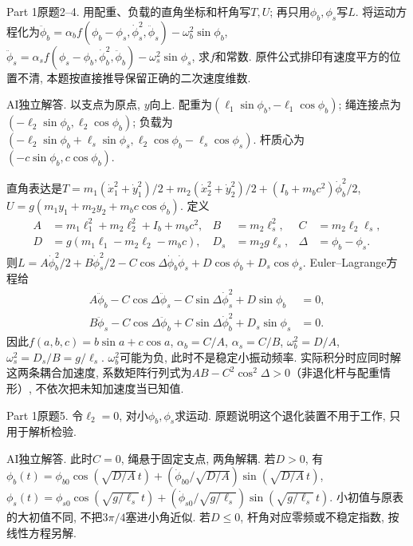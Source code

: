 \begin{exercise}
Part 1原题2--4. 用配重、负载的直角坐标和杆角写$T,U$; 再只用$\phi_b,\phi_s$写$L$. 将运动方程化为$\ddot\phi_b=\alpha_b f(\phi_b-\phi_s,\dot\phi_s^2,\ddot\phi_s)-\omega_b^2\sin\phi_b$, $\ddot\phi_s=\alpha_s f(\phi_s-\phi_b,\dot\phi_b^2,\ddot\phi_b)-\omega_s^2\sin\phi_s$, 求$f$和常数. 原件公式排印有速度平方的位置不清, 本题按直接推导保留正确的二次速度维数.
\end{exercise}
\begin{solution}
AI独立解答. 以支点为原点, $y$向上. 配重为$(\ell_1\sin\phi_b,-\ell_1\cos\phi_b)$; 绳连接点为$(-\ell_2\sin\phi_b,\ell_2\cos\phi_b)$; 负载为$(-\ell_2\sin\phi_b+\ell_s\sin\phi_s,\ell_2\cos\phi_b-\ell_s\cos\phi_s)$. 杆质心为$(-c\sin\phi_b,c\cos\phi_b)$.

直角表达是$T=m_1(\dot x_1^2+\dot y_1^2)/2+m_2(\dot x_2^2+\dot y_2^2)/2+(I_b+m_bc^2)\dot\phi_b^2/2$, $U=g(m_1y_1+m_2y_2+m_bc\cos\phi_b)$. 定义
\begin{align*}
A&=m_1\ell_1^2+m_2\ell_2^2+I_b+m_bc^2,&B&=m_2\ell_s^2,&C&=m_2\ell_2\ell_s,\\
D&=g(m_1\ell_1-m_2\ell_2-m_bc),&D_s&=m_2g\ell_s,&\Delta&=\phi_b-\phi_s.
\end{align*}
则$L=A\dot\phi_b^2/2+B\dot\phi_s^2/2-C\cos\Delta\dot\phi_b\dot\phi_s+D\cos\phi_b+D_s\cos\phi_s$. Euler--Lagrange方程给
\begin{align*}
A\ddot\phi_b-C\cos\Delta\ddot\phi_s-C\sin\Delta\dot\phi_s^2+D\sin\phi_b&=0,\\
B\ddot\phi_s-C\cos\Delta\ddot\phi_b+C\sin\Delta\dot\phi_b^2+D_s\sin\phi_s&=0.
\end{align*}
因此$f(a,b,c)=b\sin a+c\cos a$, $\alpha_b=C/A$, $\alpha_s=C/B$, $\omega_b^2=D/A$, $\omega_s^2=D_s/B=g/\ell_s$. $\omega_b^2$可能为负, 此时不是稳定小振动频率. 实际积分时应同时解这两条耦合加速度, 系数矩阵行列式为$AB-C^2\cos^2\Delta>0$（非退化杆与配重情形）, 不依次把未知加速度当已知值.
\end{solution}

\begin{exercise}
Part 1原题5. 令$\ell_2=0$, 对小$\phi_b,\phi_s$求运动. 原题说明这个退化装置不用于工作, 只用于解析检验.
\end{exercise}
\begin{solution}
AI独立解答. 此时$C=0$, 绳悬于固定支点, 两角解耦. 若$D>0$, 有$\phi_b(t)=\phi_{b0}\cos(\sqrt{D/A}\,t)+(\dot\phi_{b0}/\sqrt{D/A})\sin(\sqrt{D/A}\,t)$, $\phi_s(t)=\phi_{s0}\cos(\sqrt{g/\ell_s}\,t)+(\dot\phi_{s0}/\sqrt{g/\ell_s})\sin(\sqrt{g/\ell_s}\,t)$. 小初值与原表的大初值不同, 不把$3\pi/4$塞进小角近似. 若$D\le0$, 杆角对应零频或不稳定指数, 按线性方程另解.
\end{solution}

